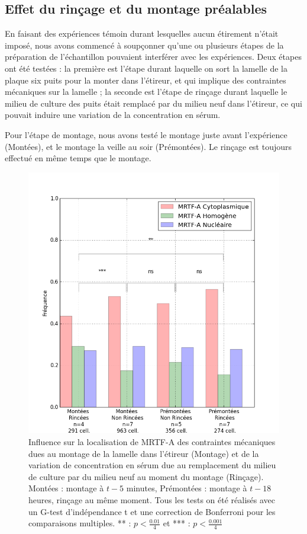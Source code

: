 \subsection{Effet du rinçage et du montage préalables \label{Rinçage}}

En faisant des expériences témoin durant lesquelles aucun étirement n'était imposé, nous avons commencé à soupçonner qu'une ou plusieurs étapes de la préparation de l'échantillon pouvaient interférer avec les expériences. 
Deux étapes ont été testées : la première est l'étape durant laquelle on sort la lamelle de la plaque six puits pour la monter dans l'étireur, et qui implique des contraintes mécaniques sur la lamelle ; la seconde est l'étape de rinçage durant laquelle le milieu de culture des puits était remplacé par du milieu neuf dans l'étireur, ce qui pouvait induire une variation de la concentration en sérum. 

Pour l'étape de montage, nous avons testé le montage juste avant l'expérience (Montées), et le montage la veille au soir (Prémontées). 
Le rinçage est toujours effectué en même temps que le montage. 


\begin{figure}
\includegraphics[scale=0.5]{Figures/CHN_montage_rincage.png} 
\caption{\label{CHN_montage} Influence sur la localisation de MRTF-A des contraintes mécaniques dues au montage de la lamelle dans l'étireur (Montage) et de la variation de concentration en sérum due au remplacement du milieu de culture par du milieu neuf au moment du montage (Rinçage). Montées : montage à $t-5$ minutes, Prémontées : montage à $t-18$ heures, rinçage au même moment.
Tous les tests on été réalisés avec un G-test d'indépendance t et une correction de Bonferroni pour les comparaisons multiples. ** : $p<\frac{0.01}{4}$ et *** : $p<\frac{0.001}{4}$}
\end{figure}

